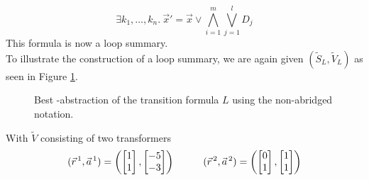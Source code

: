 \begin{equation*}
	\exists k_1, \ldots, k_n.\ \vec{x}' = \vec{x} \lor \bigwedge_{i=1}^{m} \bigvee_{j=1}^l D_j 
\end{equation*}
This formula is now a loop summary. \\
To illustrate the construction of a loop summary, we are again given $(\tilde{S}_L, \tilde{V}_L)$ as seen in Figure \ref{nonabbridged}.
\begin{figure}[H]
	\centering
	
	\caption{Best \qvasr-abstraction of the transition formula $L$ using the non-abridged notation.}
	\label{nonabbridged}
\end{figure}

 With $\tilde{V}$ consisting of two transformers
\begin{align*}
	(\vec{r}^{\, 1}, \vec{a}^{\, 1}) = 		
	\begin{pmatrix}
		\begin{bmatrix}
			1 \\
			1 
		\end{bmatrix},
		\begin{bmatrix}
			-5 \\
			-3 
		\end{bmatrix}
	\end{pmatrix} \hspace*{1cm}
	(\vec{r}^{\, 2}, \vec{a}^{\, 2}) = 		
	\begin{pmatrix}
		\begin{bmatrix}
			0 \\
			1 
		\end{bmatrix},
		\begin{bmatrix}
			1 \\
			1 
		\end{bmatrix}
	\end{pmatrix}
\end{align*}

